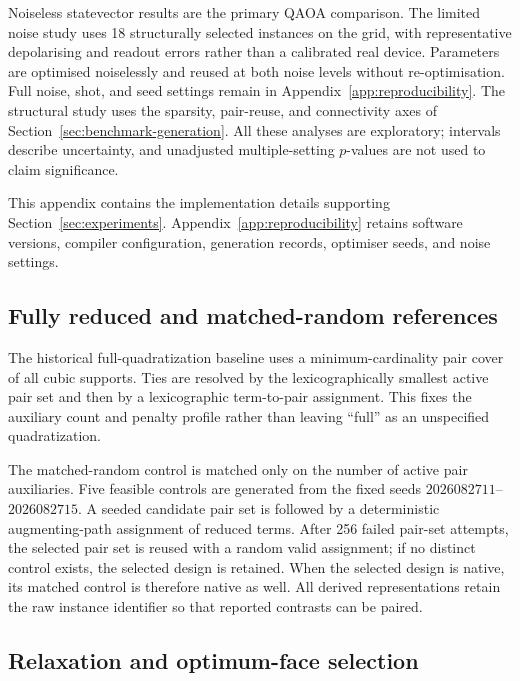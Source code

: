 \documentclass[a4paper,onecolumn,11pt,unpublished]{quantumarticle}
\theoremstyle{remark}
\begin{document}
Noiseless statevector results are the primary QAOA comparison. The limited
noise study uses 18 structurally selected instances on the grid, with
representative depolarising and readout errors rather than a calibrated real
device. Parameters are optimised noiselessly and reused at both noise levels
without re-optimisation. Full noise, shot, and seed settings remain in
Appendix~\ref{app:reproducibility}. The structural study uses the sparsity,
pair-reuse, and connectivity axes of Section~\ref{sec:benchmark-generation}.
All these analyses are exploratory; intervals describe uncertainty, and
unadjusted multiple-setting $p$-values are not used to claim significance.



This appendix contains the implementation details supporting
Section~\ref{sec:experiments}. Appendix~\ref{app:reproducibility} retains
software versions, compiler configuration, generation records, optimiser
seeds, and noise settings.

\subsection{Fully reduced and matched-random references}
\label{app:experimental-controls}

The historical full-quadratization baseline uses a minimum-cardinality pair cover of all
cubic supports.  Ties are resolved by the lexicographically smallest active
pair set and then by a lexicographic term-to-pair assignment.  This fixes the
auxiliary count and penalty profile rather than leaving ``full'' as an
unspecified quadratization.

The matched-random control is matched only on the number of active pair
auxiliaries.  Five feasible controls are generated from the fixed seeds
$2026082711$--$2026082715$.  A seeded candidate pair set is followed by a
deterministic augmenting-path assignment of reduced terms.  After 256 failed
pair-set attempts, the selected pair set is reused with a random valid
assignment; if no distinct control exists, the selected design is retained.
When the selected design is native, its matched control is therefore native as
well.  All derived representations retain the raw instance identifier so that
reported contrasts can be paired.


\subsection{Relaxation and optimum-face selection}
\label{app:experimental-lp}
\end{document}

